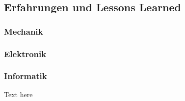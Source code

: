 \documentclass[main.tex]{subfiles} %
\begin{document}

\subsection{Erfahrungen und Lessons Learned}

\subsubsection{Mechanik}

\subsubsection{Elektronik}


\subsubsection{Informatik}

Text here
\end{document}
